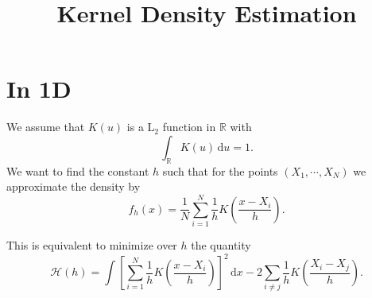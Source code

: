 \documentclass[aps,onecolumn]{revtex4}
\begin{document}
\title{Kernel Density Estimation}
\maketitle

\section{In 1D}
We assume that $K(u)$ is a $\mathrm{L}_2$ function in $\mathbb{R}$ with
\begin{equation}
	\int_{\mathbb{R}} K(u)\,\mathrm{d}u = 1.
\end{equation}
We want to find the constant $h$ such that for the points $(X_1,\cdots,X_N)$ we
approximate the density by
\begin{equation}
	f_h(x) = \dfrac{1}{N} \sum_{i=1}^N \dfrac{1}{h} K\left(\dfrac{x-X_i}{h}\right).
\end{equation}

This is equivalent to minimize over $h$ the quantity
\begin{equation}
	\mathcal{H}(h) = \int \left[\sum_{i=1}^N \dfrac{1}{h} K\left(\dfrac{x-X_i}{h}\right)\right]^2 \, \mathrm{d}x
	 - 2 \sum_{i\not=j} \dfrac{1}{h} K\left(\dfrac{X_i-X_j}{h}\right).
\end{equation} 
 
\end{document}
